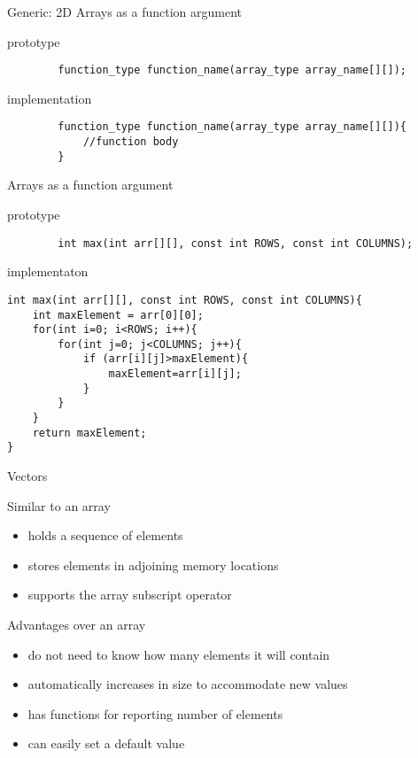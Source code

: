 \documentclass[xcolor={dvipsnames}]{beamer}
\begin{document}
\begin{frame}[fragile]{Generic: 2D Arrays as a function argument}
	\begin{block}{prototype}
	\begin{verbatim}
		function_type function_name(array_type array_name[][]);
	\end{verbatim}
	\end{block}
	\pause
	\begin{block}{implementation}
	\begin{verbatim}
		function_type function_name(array_type array_name[][]){
			//function body
		}
	\end{verbatim}
	\end{block}
\end{frame}

\begin{frame}[fragile]{Arrays as a function argument}
	\begin{block}{prototype}
	\begin{verbatim}
		int max(int arr[][], const int ROWS, const int COLUMNS);
	\end{verbatim}
	\end{block}
	\pause
	\begin{block}{implementaton}
	\begin{verbatim}
int max(int arr[][], const int ROWS, const int COLUMNS){
    int maxElement = arr[0][0];
    for(int i=0; i<ROWS; i++){
        for(int j=0; j<COLUMNS; j++){
            if (arr[i][j]>maxElement){
                maxElement=arr[i][j];
            }
        }
    }
    return maxElement;
}
	\end{verbatim}
	\end{block}
\end{frame}

\begin{frame}{Vectors}

\begin{block}{Similar to an array}
	\begin{itemize}
		\item holds a sequence of elements
		\item stores elements in adjoining memory locations
		\item supports the array subscript operator \textbf{\[\]}
	\end{itemize}
\end{block}

\begin{block}{Advantages over an array}
	\begin{itemize}
		\item do not need to know how many elements it will contain
		\item automatically increases in size to accommodate new values
		\item has functions for reporting number of elements
		\item can easily set a default value
	\end{itemize}
\end{block}
\end{frame}
\end{document}
